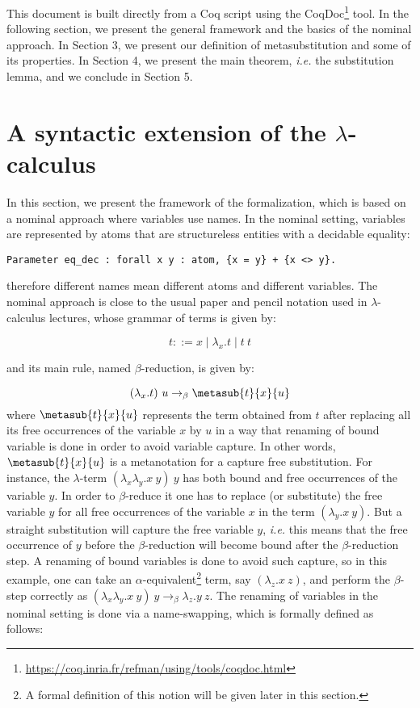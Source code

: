 This document is built directly from a Coq script using the CoqDoc\footnote{\url{https://coq.inria.fr/refman/using/tools/coqdoc.html}} tool. In the following section, we present the general framework and the basics of the nominal approach. In Section 3, we present our definition of metasubstitution and some of its properties. In Section 4, we present the main theorem, {\it i.e.} the substitution lemma, and we conclude in Section 5.

\section{A syntactic extension of the $\lambda$-calculus}



 In this section, we present the framework of the formalization, which is based on a nominal approach\cite{gabbayNewApproachAbstract1999} where variables use names. In the nominal setting, variables are represented by atoms that are structureless entities with a decidable equality: 


\begin{verbatim}
Parameter eq_dec : forall x y : atom, {x = y} + {x <> y}.
\end{verbatim}


\noindent therefore different names mean different atoms and different variables. The nominal approach is close to the usual paper and pencil notation used in $\lambda$-calculus lectures, whose grammar of terms is given by:


\begin{equation}\label{lambda:grammar}
 t ::= x \mid \lambda_x.t \mid t\ t
\end{equation}


\noindent and its main rule, named $\beta$-reduction, is given by:


\begin{equation}\label{lambda:beta}
 (\lambda_x.t)\ u \to_{\beta} \metasub{t}{x}{u}
\end{equation}
\noindent where $\metasub{t}{x}{u}$ represents the term obtained from $t$ after replacing all its free occurrences of the variable $x$ by $u$ in a way that renaming of bound variable is done in order to avoid variable capture. In other words, $\metasub{t}{x}{u}$ is a metanotation for a capture free substitution. For instance, the $\lambda$-term $(\lambda_x\lambda_y.x\ y)\ y$ has both bound and free occurrences of the variable $y$. In order to $\beta$-reduce it one has to replace (or substitute) the free variable $y$ for all free occurrences of the variable $x$ in the term $(\lambda_y.x\ y)$. But a straight substitution will capture the free variable $y$, {\it i.e.} this means that the free occurrence of $y$ before the $\beta$-reduction will become bound after the $\beta$-reduction step. A renaming of bound variables is done to avoid such capture, so in this example, one can take an $\alpha$-equivalent\footnote{A formal definition of this notion will be given later in this section.} term, say $(\lambda_z.x\ z)$, and perform the $\beta$-step correctly as $(\lambda_x\lambda_y.x\ y)\ y \to_{\beta} \lambda_z.y\ z$. The renaming of variables in the nominal setting is done via a name-swapping, which is formally defined as follows:


